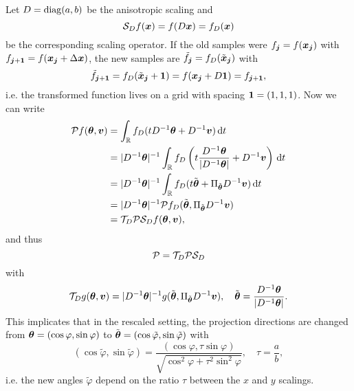 \documentclass{amsart}
\newcommand*{\Dinv}{{\ensuremath{D^{-1}}}}
\renewcommand*{\phi}{\varphi}
\begin{document}
Let $D = \operatorname*{diag}(a,b)$ be the anisotropic scaling and
%
\begin{equation}
 \label{eq:vol_scaling}
 {\ensuremath{\mathcal{S}}}_D f({\boldsymbol{x}}) = f(D{\boldsymbol{x}}) = f_D({\boldsymbol{x}})
\end{equation}
%
be the corresponding scaling operator. If the old samples were $f_{\boldsymbol{j}} = f({\boldsymbol{x}}_{\boldsymbol{j}})$ with $f_{{\boldsymbol{j}}+{\boldsymbol{1}}} = f({\boldsymbol{x}}_{\boldsymbol{j}} + \Delta{\boldsymbol{x}})$, the new 
samples are $\tilde f_{{\boldsymbol{j}}} = f_D(\tilde{{\boldsymbol{x}}}_{\boldsymbol{j}})$ with 
%
\begin{equation*}
 \tilde f_{{\boldsymbol{j}}+{\boldsymbol{1}}} = f_D(\tilde{{\boldsymbol{x}}}_{\boldsymbol{j}} + {\boldsymbol{1}}) = f({\boldsymbol{x}}_{\boldsymbol{j}} + D{\boldsymbol{1}}) = f_{{\boldsymbol{j}}+{\boldsymbol{1}}},
\end{equation*}
%
i.e. the transformed function lives on a grid with spacing ${\boldsymbol{1}} = (1,1,1)$. Now we can write
%
\begin{align*}
 \Pop f(\Btheta, \Bv) 
 &= \int_\RR f_D(t \Dinv\Btheta + \Dinv\Bv)\, \diff t \\
 &= \abs{\Dinv\Btheta}^{-1} \int_\RR f_D\left(t \frac{\Dinv\Btheta}{\abs{\Dinv\Btheta}} + \Dinv\Bv\right)\, \diff t \\
 &= \abs{\Dinv\Btheta}^{-1} \int_\RR f_D(t \tilde\Btheta + \Pi_{\tilde\Btheta} \Dinv\Bv)\, \diff t \\
 &= \abs{\Dinv\Btheta}^{-1} \Pop f_D (\tilde\Btheta, \Pi_{\tilde\Btheta} \Dinv\Bv) \\
 &= \Top_D \Pop \Sop_D f(\Btheta, \Bv),
\end{align*}
%
and thus
%
\begin{equation}
 \label{eq:xray_fwd_scaling}
 {\ensuremath{\mathcal{P}}} = {\mathcal{T}}_D {\mathcal{P}} {\mathcal{S}}_D
\end{equation}
%
with 
%
\begin{equation}
 \label{eq:proj_scaling}
 \Top_D g(\Btheta, \Bv) = \abs{\Dinv\Btheta}^{-1} g(\tilde\Btheta, \Pi_{\tilde\Btheta} \Dinv\Bv),\quad 
 \tilde\Btheta = \frac{\Dinv\Btheta}{\abs{\Dinv\Btheta}}.
\end{equation}
%
This implicates that in the rescaled setting, the projection directions are changed from $\Btheta = (\cos\phi, \sin\phi)$ to 
$\tilde\Btheta = (\cos\tilde\phi, \sin\tilde\phi)$ with 
%
\begin{equation}
 \label{eq:fwd_new_angles}
 (\cos\tilde\phi, \sin\tilde\phi) = \frac{(\cos\phi, \tau \sin\phi)}{\sqrt{\cos^2\phi + \tau^2\sin^2\phi}},\quad \tau = \frac{a}{b},
\end{equation}
%
i.e. the new angles $\tilde\phi$ depend on the ratio $\tau$ between the $x$ and $y$ scalings.
\end{document}
